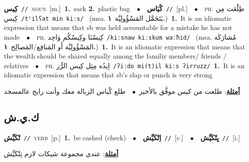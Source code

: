 \documentclass[10pt,a4paper,twoside]{article} %
\begin{document}
\begin{multicols}{2}
{\setlength\topsep{0pt}\textbf{\foreignlanguage{arabic}{كِيس}}\ {\color{gray}\texttt{//}\color{black}}\ \textsc{noun}\ [m.]\ \textbf{1.}~sack  \textbf{2.}~plastic bag\ \ $\bullet$\ \ \setlength\topsep{0pt}\textbf{\foreignlanguage{arabic}{كْيَاس}}\ {\color{gray}\texttt{//}\color{black}}\ [pl.]\ \ $\bullet$\ \ \textsc{ph.} \color{gray} \foreignlanguage{arabic}{طِلْعَت مِن كِيس}\color{black}\ {\color{gray}\texttt{/{\sffamily tˤilʕat min kiːs}/}\color{black}}\ \color{gray} (msa. \foreignlanguage{arabic}{يَتَحَمَّل المَسْؤُولِيَّة}~\foreignlanguage{arabic}{\textbf{١.}})\color{black}\ \textbf{1.}~It is an idiomatic expression that means that sb was held accountable for a mistake he has not made\ \ $\bullet$\ \ \textsc{ph.} \color{gray} \foreignlanguage{arabic}{كِيسْنَا وكِيسْكُم وَاحِد}\color{black}\ {\color{gray}\texttt{/{\sffamily kiːsnaw kiːskum waːħid}/}\color{black}}\ \color{gray} (msa. \foreignlanguage{arabic}{مُشارَكَة المَسْؤُولِيَّة أَو المَنافِع/المَصالِح}~\foreignlanguage{arabic}{\textbf{١.}})\color{black}\ \textbf{1.}~It is an idiomatic expression that means that the wealth should be shared equally among the familiy members/ friends / relatives\ \ $\bullet$\ \ \textsc{ph.} \color{gray} \foreignlanguage{arabic}{اِيدُه مِثِل كِيس الرُّز}\color{black}\ {\color{gray}\texttt{/{\sffamily ʔiːdo mi(t)il kiːs ʔirruzz}/}\color{black}}\ \textbf{1.}~It is an idiomatic expression that means that sb's slap or punch is very strong\  \begin{flushright}\color{gray}\foreignlanguage{arabic}{\textbf{\underline{\foreignlanguage{arabic}{أمثلة}}}: طلعت من كيس موفَّق بالأخير\ $\bullet$\ \  طلع كْياس الزبالة معك وأنت رايح عالمسجد}\end{flushright}\color{black}} \vspace{2mm}

\vspace{-3mm}
\subsection*{\color{blue}\foreignlanguage{arabic}{ك.ي.ش}\color{blue}{}} 

{\setlength\topsep{0pt}\textbf{\foreignlanguage{arabic}{تْكَيَّش}}\ {\color{gray}\texttt{//}\color{black}}\ \textsc{verb}\ [p.]\ \textbf{1.}~be cashed (check)\ \ $\bullet$\ \ \setlength\topsep{0pt}\textbf{\foreignlanguage{arabic}{اِتْكَيَّش}}\ {\color{gray}\texttt{//}\color{black}}\ [c.]\ \ $\bullet$\ \ \setlength\topsep{0pt}\textbf{\foreignlanguage{arabic}{يِتْكَيَّش}}\ {\color{gray}\texttt{//}\color{black}}\ [i.]\  \begin{flushright}\color{gray}\foreignlanguage{arabic}{\textbf{\underline{\foreignlanguage{arabic}{أمثلة}}}: عندي مجموعة شيكات لازم تِتْكَيَّش}\end{flushright}\color{black}} \vspace{2mm}


\end{multicols}
\end{document}
